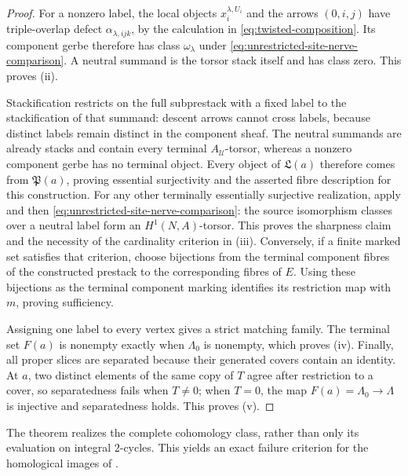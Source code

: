 \begin{proof}
For a nonzero label, the local objects
\(x_i^{\lambda,U_i}\) and the arrows \((0,i,j)\) have triple-overlap defect
\(\alpha_{\lambda,ijk}\), by the calculation in
\eqref{eq:twisted-composition}.  Its component gerbe therefore has class
\(\omega_\lambda\) under
\eqref{eq:unrestricted-site-nerve-comparison}.  A neutral summand is the
torsor stack itself and has class zero.  This proves (ii).

Stackification restricts on the full subprestack with a fixed label to the
stackification of that summand: descent arrows cannot cross labels, because
distinct labels remain distinct in the component sheaf.  The neutral
summands are already stacks and contain every terminal
\(A_{\mathcal U}\)-torsor, whereas a nonzero component gerbe has no terminal
object.  Every object of \(\mathfrak L(a)\) therefore comes from
\(\mathfrak P(a)\), proving essential surjectivity and the asserted fibre
description for this construction.  For any other terminally essentially
surjective realization, apply
 and then
\eqref{eq:unrestricted-site-nerve-comparison}: the source isomorphism classes
over a neutral label form an \(H^1(N,A)\)-torsor.  This proves the sharpness
claim and the necessity of the cardinality criterion in (iii).  Conversely,
if a finite marked set satisfies that criterion, choose bijections from the
terminal component fibres of the constructed prestack to the corresponding
fibres of \(E\).  Using these bijections as the terminal component marking
identifies its restriction map with \(m\), proving sufficiency.

Assigning one label to every vertex gives a strict matching family.  The
terminal set \(F(a)\) is nonempty exactly when \(\Lambda_0\) is nonempty,
which proves (iv).  Finally, all proper slices are separated because their
generated covers contain an identity.  At \(a\), two distinct elements of
the same copy of \(T\) agree after restriction to a cover, so separatedness
fails when \(T\ne0\); when \(T=0\), the map
\(F(a)=\Lambda_0\to\Lambda\) is injective and separatedness holds.  This
proves (v).
\end{proof}

The theorem realizes the complete cohomology class, rather than only its
evaluation on integral \(2\)-cycles.  This yields an exact failure criterion
for the homological images of .

